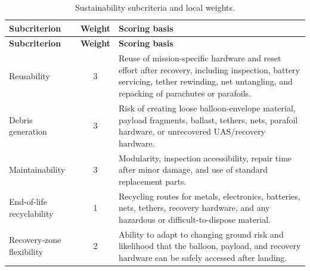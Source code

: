{
\small
\setlength{\LTleft}{0pt}
\setlength{\LTright}{0pt}

\begin{longtable}{@{}p{} c p{}@{}}
\caption{Sustainability subcriteria and local weights.}
\label{tab:sustainability_subcriteria_weights} \\
\toprule
\textbf{Subcriterion} & \textbf{Weight} & \textbf{Scoring basis} \\
\midrule
\endfirsthead

\toprule
\textbf{Subcriterion} & \textbf{Weight} & \textbf{Scoring basis} \\
\midrule
\endhead

\bottomrule
\endfoot

Reusability & 3 & Reuse of mission-specific hardware and reset effort after recovery, including inspection, battery servicing, tether rewinding, net untangling, and repacking of parachutes or parafoils. \\
Debris generation & 3 & Risk of creating loose balloon-envelope material, payload fragments, ballast, tethers, nets, parafoil hardware, or unrecovered UAS/recovery hardware. \\
Maintainability & 3 & Modularity, inspection accessibility, repair time after minor damage, and use of standard replacement parts. \\
End-of-life recyclability & 1 & Recycling routes for metals, electronics, batteries, nets, tethers, recovery hardware, and any hazardous or difficult-to-dispose material. \\
Recovery-zone flexibility & 2 & Ability to adapt to changing ground risk and likelihood that the balloon, payload, and recovery hardware can be safely accessed after landing. \\

\end{longtable}
}


